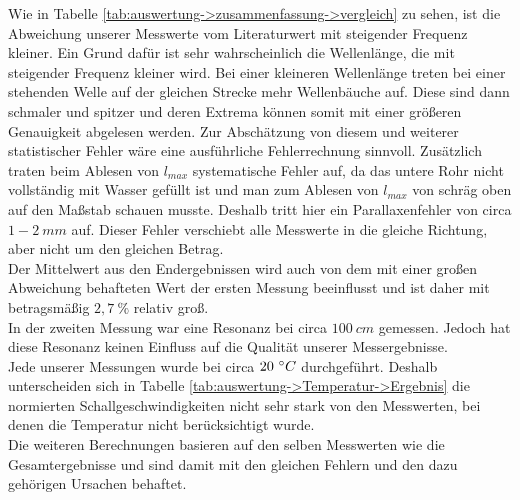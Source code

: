 Wie in Tabelle \ref{tab:auswertung->zusammenfassung->vergleich} zu sehen, ist die Abweichung unserer Messwerte vom Literaturwert mit steigender Frequenz kleiner. Ein Grund dafür ist sehr wahrscheinlich die Wellenlänge, die mit steigender Frequenz kleiner wird. %
Bei einer kleineren Wellenlänge treten bei einer stehenden Welle auf der gleichen Strecke mehr Wellenbäuche auf. Diese sind dann schmaler und spitzer und deren Extrema können somit mit einer größeren Genauigkeit abgelesen werden. Zur Abschätzung von diesem und weiterer statistischer Fehler wäre eine ausführliche Fehlerrechnung sinnvoll.
Zusätzlich traten beim Ablesen von $l_{max}$ systematische Fehler auf, da das untere Rohr nicht vollständig mit Wasser gefüllt ist und man zum Ablesen von $l_{max}$ von schräg oben auf den Maßstab schauen musste. Deshalb tritt hier ein Parallaxenfehler von circa $1-2~mm$ auf. Dieser Fehler verschiebt alle Messwerte in die gleiche Richtung, aber nicht um den gleichen Betrag. \\
Der Mittelwert aus den Endergebnissen wird auch von dem mit einer großen Abweichung behafteten Wert der ersten Messung beeinflusst und ist daher mit betragsmäßig $2,7~\%$ relativ groß. \\[5pt]

In der zweiten Messung war eine Resonanz bei circa $100~cm$ gemessen. Jedoch hat diese Resonanz keinen Einfluss auf die Qualität unserer Messergebnisse.\\[5pt]

Jede unserer Messungen wurde bei circa $20~^\circ C$ durchgeführt. Deshalb unterscheiden sich in Tabelle \ref{tab:auswertung->Temperatur->Ergebnis} die normierten Schallgeschwindigkeiten nicht sehr stark von den Messwerten, bei denen die Temperatur nicht berücksichtigt wurde. \\[5pt]

Die weiteren Berechnungen basieren auf den selben Messwerten wie die Gesamtergebnisse und sind damit mit den gleichen Fehlern und den dazu gehörigen Ursachen behaftet.

